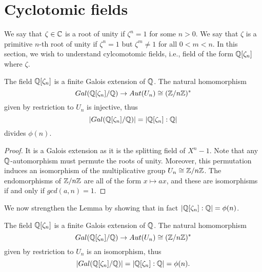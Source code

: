 \documentclass[twoside, a4paper, 10pt]{amsart}
\begin{document}
\section{Cyclotomic fields}

We say that $\zeta \in \mathbb{C}$ is a root of unity if $\zeta^n = 1$ for some $n>0$. We say that $\zeta$ is a primitive $n$-th root of unity if $\zeta^n = 1$ but $\zeta^m \neq 1$ for all $0<m<n$. In this section, we wish to understand cylcomotomic fields, i.e., field of the form $\mathbb{Q}[\zeta_n]$ where $\zeta$.

\begin{lemma} The field $\mathbb{Q}[\zeta_n]$ is a finite Galois extension of $\mathbb{Q}$. The natural homomorphism $$Gal(\mathbb{Q}[\zeta_n]/ \mathbb{Q}) \to Aut(U_n) \cong (\mathbb{Z}/n\mathbb{Z})^*$$ given by restriction to $U_n$ is injective, thus $$|Gal(\mathbb{Q}[\zeta_n]/\mathbb{Q})| = |\mathbb{Q}[\zeta_n]:\mathbb{Q}|$$ divides $\phi(n)$. 

\end{lemma}

\begin{proof} It is a Galois extension as it is the splitting field of $X^n - 1$. Note that any $\mathbb{Q}$-automorphism must permute the roots of unity. Moreover, this permutation induces an isomorphism of the multiplicative group $U_n \cong \mathbb{Z}/n\mathbb{Z}$. The endomorphisms of $\mathbb{Z}/n\mathbb{Z}$ are all of the form $x \mapsto ax$, and these are isomorphisms if and only if $gcd(a,n) = 1$. \end{proof}

We now strengthen the Lemma by showing that in fact $|\mathbb{Q}[\zeta_n]:\mathbb{Q}| = \phi(n)$.

\begin{thm} The field $\mathbb{Q}[\zeta_n]$ is a finite Galois extension of $\mathbb{Q}$. The natural homomorphism $$Gal(\mathbb{Q}[\zeta_n]/ \mathbb{Q}) \to Aut(U_n) \cong (\mathbb{Z}/n\mathbb{Z})^*$$ given by restriction to $U_n$ is an isomorphism, thus $$|Gal(\mathbb{Q}[\zeta_n]/\mathbb{Q})| = |\mathbb{Q}[\zeta_n]:\mathbb{Q}| = \phi(n).$$

\end{thm}
\end{document}
